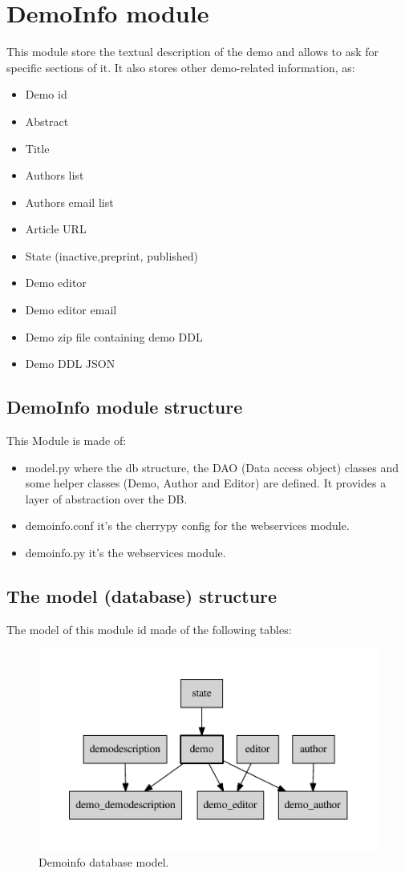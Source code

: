 \section{DemoInfo module}
This module store the textual description of the demo and allows to ask for specific sections of it. It also stores other demo-related information, as:
\begin{itemize}
\item Demo id
\item Abstract
\item Title 
\item Authors list
\item Authors email list
\item Article URL
\item State (inactive,preprint, published)
\item Demo editor
\item Demo editor email
\item Demo zip file containing demo DDL 
\item Demo DDL JSON
\end{itemize}

\subsection{DemoInfo module structure}
This Module is made of:
\begin{itemize}
  \item model.py where the db structure, the DAO (Data access object) classes and some helper classes (Demo, Author and Editor) are defined. It provides a layer of abstraction over the DB.
  \item demoinfo.conf it's the cherrypy config for the webservices module.
  \item demoinfo.py it's the webservices module.
\end{itemize}

\subsection{The model (database) structure}
The model of this module id made of the following tables:

\begin{figure}[!ht]
    \centering
    \includegraphics[width=0.8\linewidth]{demoinfo/images/demoinfo_model.pdf}
    \caption{Demoinfo database model.}
    \label{fig:demoinfo_model}
\end{figure}

